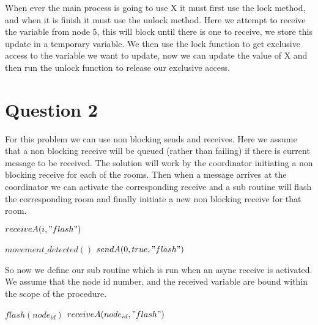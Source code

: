 \documentclass[a4paper, 12pt]{article}
\begin{document}
		When ever the main process is going to use X it must first use the lock method, and when it is finish it must use the unlock method. Here we attempt to receive the variable from node 5, this will block until there is one to receive, we store this update in a temporary variable. We then use the lock function to get exclusive access to the variable we want to update, now we can update the value of X and then run the unlock function to release our exclusive access.
  		
  	\section{Question 2}
		For this problem we can use non blocking sends and receives. Here we assume that a non blocking receive will be queued (rather than failing) if there is current message to be received. The solution will work by the coordinator initiating a non blocking receive for each of the rooms. Then when a message arrives at the coordinator we can activate the corresponding receive and a sub routine will flash the corresponding room and finally initiate a new non blocking receive for that room.
		
		\begin{algorithm}[H]
			\begin{algorithmic}[1]			
						\State $receiveA(i, "flash")$
					\EndFor
				\EndProcedure
			\end{algorithmic}
		\end{algorithm}
		
		\begin{algorithm}[H]
			\begin{algorithmic}[1]			
						\State $movement\_detected()$
						\State $sendA(0, true, "flash")$
					\EndWhile
				\EndProcedure
			\end{algorithmic}
		\end{algorithm}
		
		So now we define our sub routine which is run when an async receive is activated. We assume that the node id number, and the received variable are bound within the scope of the procedure.
		
		\begin{algorithm}[H]
			\begin{algorithmic}[1]
										\State $flash(node_{id})$
					\State $receiveA(node_{id}, "flash")$
				\EndProcedure			
			\end{algorithmic}
		\end{algorithm}
		
\end{document}
